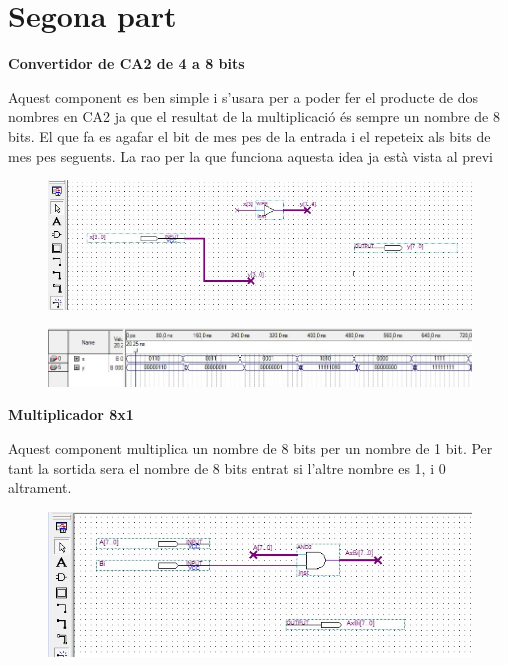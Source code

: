 \documentclass[12pt, a4papre]{article}
\begin{document}
	\newpage
	\section{Segona part}
	\textbf{\large{Convertidor de CA2 de 4 a 8 bits}}
	
	Aquest component es ben simple i s'usara per a poder fer el producte de dos nombres en CA2 ja que el resultat de la multiplicació és sempre un nombre de 8 bits. El que fa es agafar el bit de mes pes de la entrada i el repeteix als bits de mes pes seguents. La rao per la que funciona aquesta idea ja està vista al previ
	
	\begin{figure}[H]
		\begin{center}
		\includegraphics[width=150mm]{CA2_4_a_8.jpeg}
		\end{center}
	\end{figure}
	\begin{figure}[H]
		\begin{center}
		\includegraphics[width=150mm]{CA2_4A8simul.jpeg}
		\end{center}
	\end{figure}
	
	\textbf{\large{Multiplicador 8x1}}
	
	Aquest component multiplica un nombre de 8 bits per  un nombre de 1 bit. Per tant la sortida sera el nombre de 8 bits entrat si l'altre nombre es 1, i 0 altrament.
	
	\begin{figure}[H]
		\begin{center}
		\includegraphics[width=150mm]{MULT8x1.jpeg}
		\end{center}
	\end{figure}
	
\end{document}
